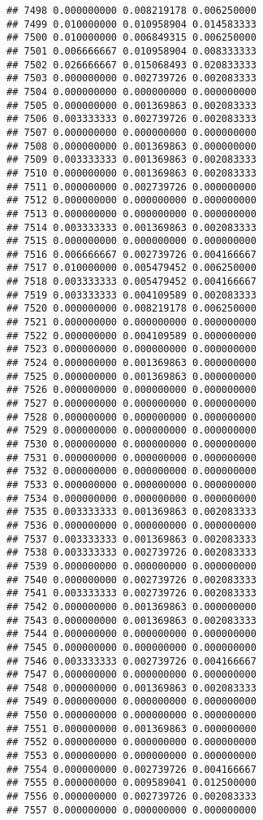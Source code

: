 \documentclass[
]{article}
\begin{document}
\begin{verbatim}
## 7498 0.000000000 0.008219178 0.006250000
## 7499 0.010000000 0.010958904 0.014583333
## 7500 0.010000000 0.006849315 0.006250000
## 7501 0.006666667 0.010958904 0.008333333
## 7502 0.026666667 0.015068493 0.020833333
## 7503 0.000000000 0.002739726 0.002083333
## 7504 0.000000000 0.000000000 0.000000000
## 7505 0.000000000 0.001369863 0.002083333
## 7506 0.003333333 0.002739726 0.002083333
## 7507 0.000000000 0.000000000 0.000000000
## 7508 0.000000000 0.001369863 0.000000000
## 7509 0.003333333 0.001369863 0.002083333
## 7510 0.000000000 0.001369863 0.002083333
## 7511 0.000000000 0.002739726 0.000000000
## 7512 0.000000000 0.000000000 0.000000000
## 7513 0.000000000 0.000000000 0.000000000
## 7514 0.003333333 0.001369863 0.002083333
## 7515 0.000000000 0.000000000 0.000000000
## 7516 0.006666667 0.002739726 0.004166667
## 7517 0.010000000 0.005479452 0.006250000
## 7518 0.003333333 0.005479452 0.004166667
## 7519 0.003333333 0.004109589 0.002083333
## 7520 0.000000000 0.008219178 0.006250000
## 7521 0.000000000 0.000000000 0.000000000
## 7522 0.000000000 0.004109589 0.000000000
## 7523 0.000000000 0.000000000 0.000000000
## 7524 0.000000000 0.001369863 0.000000000
## 7525 0.000000000 0.001369863 0.000000000
## 7526 0.000000000 0.000000000 0.000000000
## 7527 0.000000000 0.000000000 0.000000000
## 7528 0.000000000 0.000000000 0.000000000
## 7529 0.000000000 0.000000000 0.000000000
## 7530 0.000000000 0.000000000 0.000000000
## 7531 0.000000000 0.000000000 0.000000000
## 7532 0.000000000 0.000000000 0.000000000
## 7533 0.000000000 0.000000000 0.000000000
## 7534 0.000000000 0.000000000 0.000000000
## 7535 0.003333333 0.001369863 0.002083333
## 7536 0.000000000 0.000000000 0.000000000
## 7537 0.003333333 0.001369863 0.002083333
## 7538 0.003333333 0.002739726 0.002083333
## 7539 0.000000000 0.000000000 0.000000000
## 7540 0.000000000 0.002739726 0.002083333
## 7541 0.003333333 0.002739726 0.002083333
## 7542 0.000000000 0.001369863 0.000000000
## 7543 0.000000000 0.001369863 0.002083333
## 7544 0.000000000 0.000000000 0.000000000
## 7545 0.000000000 0.000000000 0.000000000
## 7546 0.003333333 0.002739726 0.004166667
## 7547 0.000000000 0.000000000 0.000000000
## 7548 0.000000000 0.001369863 0.002083333
## 7549 0.000000000 0.000000000 0.000000000
## 7550 0.000000000 0.000000000 0.000000000
## 7551 0.000000000 0.001369863 0.000000000
## 7552 0.000000000 0.000000000 0.000000000
## 7553 0.000000000 0.000000000 0.000000000
## 7554 0.000000000 0.002739726 0.004166667
## 7555 0.000000000 0.009589041 0.012500000
## 7556 0.000000000 0.002739726 0.002083333
## 7557 0.000000000 0.000000000 0.000000000

\end{verbatim}
\end{document}
